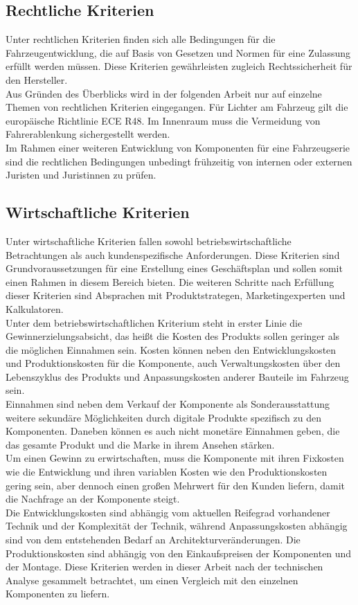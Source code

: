 \subsection{Rechtliche Kriterien}
Unter rechtlichen Kriterien finden sich alle Bedingungen für die Fahrzeugentwicklung, die auf Basis von Gesetzen und Normen für eine Zulassung erfüllt werden müssen. Diese Kriterien gewährleisten zugleich Rechtssicherheit für den Hersteller. \\
Aus Gründen des Überblicks wird in der folgenden Arbeit nur auf einzelne Themen von rechtlichen Kriterien eingegangen. Für Lichter am Fahrzeug gilt die europäische Richtlinie ECE R48. Im Innenraum muss die Vermeidung von Fahrerablenkung sichergestellt werden.\\
Im Rahmen einer weiteren Entwicklung von Komponenten für eine Fahrzeugserie sind die rechtlichen Bedingungen unbedingt frühzeitig von internen oder externen Juristen und Juristinnen zu prüfen.
\subsection{Wirtschaftliche Kriterien}
Unter wirtschaftliche Kriterien fallen sowohl betriebswirtschaftliche Betrachtungen als auch kundenspezifische Anforderungen. Diese Kriterien sind Grundvoraussetzungen für eine Erstellung eines Geschäftsplan und sollen somit einen Rahmen in diesem Bereich bieten. Die weiteren Schritte nach Erfüllung dieser Kriterien sind Absprachen mit Produktstrategen, Marketingexperten und Kalkulatoren. \\
Unter dem betriebswirtschaftlichen Kriterium steht in erster Linie die Gewinnerzielungsabsicht, das heißt die Kosten des Produkts sollen geringer als die möglichen Einnahmen sein. Kosten können neben den Entwicklungskosten und Produktionskosten für die Komponente, auch Verwaltungskosten über den Lebenszyklus des Produkts und Anpassungskosten anderer Bauteile im Fahrzeug sein. \\
Einnahmen sind neben dem Verkauf der Komponente als Sonderausstattung weitere sekundäre Möglichkeiten durch digitale Produkte spezifisch zu den Komponenten. Daneben können es auch nicht monetäre Einnahmen geben, die das gesamte Produkt und die Marke in ihrem Ansehen stärken.\\
Um einen Gewinn zu erwirtschaften, muss die Komponente mit ihren Fixkosten wie die Entwicklung und ihren variablen Kosten wie den Produktionskosten gering sein, aber dennoch einen großen Mehrwert für den Kunden liefern, damit die Nachfrage an der Komponente steigt. \\
Die Entwicklungskosten sind abhängig vom aktuellen Reifegrad vorhandener Technik und der Komplexität der Technik, während Anpassungskosten abhängig sind von dem entstehenden Bedarf an Architekturveränderungen. Die Produktionskosten sind abhängig von den Einkaufspreisen der Komponenten und der Montage. Diese Kriterien werden in dieser Arbeit nach der technischen Analyse gesammelt betrachtet, um einen Vergleich mit den einzelnen Komponenten zu liefern. \\

